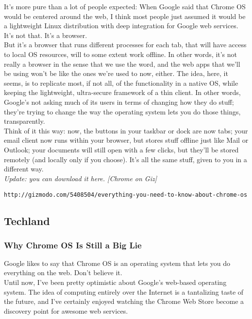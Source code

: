 \documentclass{article}
\begin{document}
			  It's more pure than a lot of people expected: When Google said that Chrome OS would be centered around the web, I think most people just assumed it would be a lightweight Linux distribution with deep integration for Google web services. It's not that. It's a browser.\\

			  But it's a browser that runs different processes for each tab, that will have access to local OS resources, will to some extent work offline. In other words, it's not really a browser in the sense that we use the word, and the web apps that we'll be using won't be like the ones we're used to now, either. The idea, here, it seems, is to replicate most, if not all, of the functionality in a native OS, while keeping the lightweight, ultra-secure framework of a thin client. In other words, Google's not asking much of its users in terms of changing how they do stuff; they're trying to change the way the operating system lets you do those things, transparently.\\

	  Think of it this way: now, the buttons in your taskbar or dock are now tabs; your email client now runs within your browser, but stores stuff offline just like Mail or Outlook; your documents will still open with a few clicks, but they'll be stored remotely (and locally only if you choose). It's all the same stuff, given to you in a different way.\\
	 \textit{Update: you can download it here. [Chrome on Giz]}
		\begin{verbatim}http://gizmodo.com/5408504/everything-you-need-to-know-about-chrome-os\end{verbatim}
		\newpage
		\subsection{Techland}
		\subsubsection{Why Chrome OS Is Still a Big Lie}
		Google likes to say that Chrome OS is an operating system that lets you do everything on the web. Don't believe it.\\

		Until now, I've been pretty optimistic about Google's web-based operating system. The idea of computing entirely over the Internet is a tantalizing taste of the future, and I've certainly enjoyed watching the Chrome Web Store become a discovery point for awesome web services.\\
\end{document}
